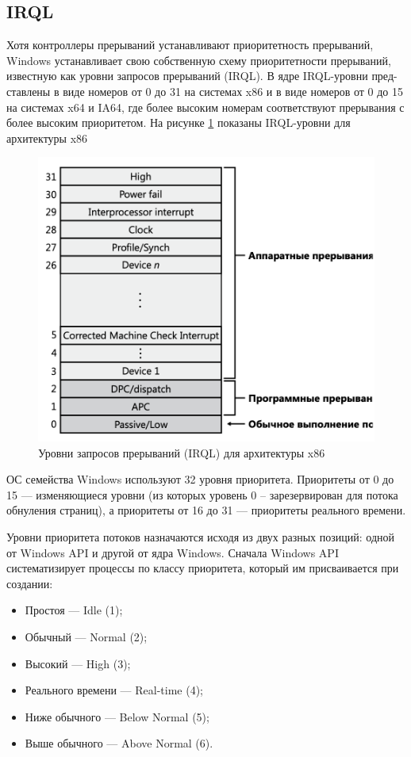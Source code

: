 \subsection{IRQL}

Хотя контроллеры прерываний устанавливают приоритетность прерываний, Windows устанавливает свою собственную схему приоритетности прерываний, известную как уровни запросов прерываний (IRQL). В ядре IRQL-уровни пред- ставлены в виде номеров от 0 до 31 на системах x86 и в виде номеров от 0 до 15 на системах x64 и IA64, где более высоким номерам соответствуют прерывания с более высоким приоритетом. 
На рисунке \ref{fig:irql} показаны IRQL-уровни для архитектуры x86

\begin{figure}[h]
	\centering
	\captionsetup{justification=centering}
	\includegraphics[width=150mm]{img/irql.png}
	\caption{Уровни  запросов прерываний (IRQL) для архитектуры x86}
	\label{fig:irql}
\end{figure}

ОС семейства Windows используют 32 уровня приоритета.
Приоритеты от 0 до 15 --- изменяющиеся уровни (из которых уровень 0 -- зарезервирован для потока обнуления страниц), а приоритеты от 16 до 31 --- приоритеты реального времени.


Уровни приоритета потоков назначаются исходя из двух разных позиций: одной от Windows API и другой от ядра Windows. Сначала Windows API систематизирует процессы по классу приоритета, который им присваивается при создании:
\begin{itemize}[label=---]
	\item Простоя --- Idle (1);
	\item Обычный --- Normal (2);
	\item Высокий --- High (3);
	\item Реального времени --- Real-time (4);
	\item Ниже обычного --- Below Normal (5);
	\item Выше обычного --- Above Normal (6).
\end{itemize}

